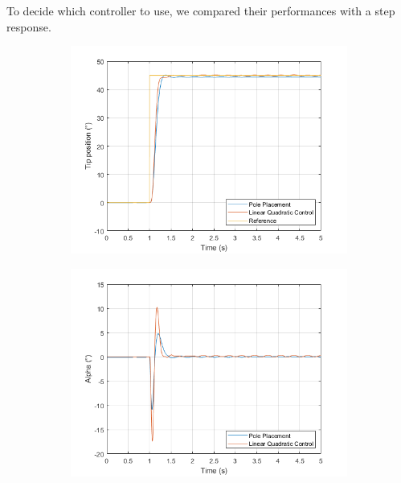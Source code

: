 To decide which controller to use, we compared their performances with a step response.

\begin{figure}[H]
     \centering
     \begin{subfigure}{0.47\textwidth}
         \centering
         \includegraphics[width=\textwidth]{./images/Chapter 4/Comparison/Step.png}
     \end{subfigure}
     \hfill
     \begin{subfigure}{0.47\textwidth}
         \centering
         \includegraphics[width=\textwidth]{./images/Chapter 4/Comparison/Alpha.png}
     \end{subfigure}
\end{figure}

